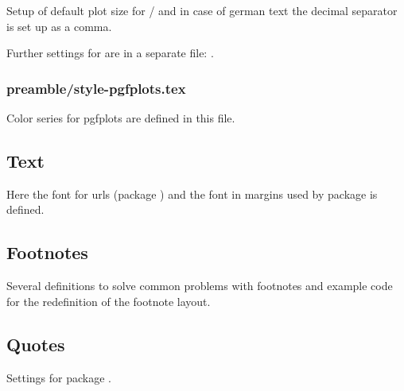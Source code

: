 Setup of default plot size for / and in case of german text the decimal separator is set up as a comma.

Further settings for  are in a separate file: 
.


\subsubsection{preamble/style-pgfplots.tex}

Color series for pgfplots are defined in this file.


\subsection{Text}
\label{sec:style:text}

Here the font for urls (package ) and the font in margins used by package  is defined.


\subsection{Footnotes}
\label{sec:style:footnote}

Several definitions to solve common problems with footnotes and example code for the redefinition of the footnote layout.


\subsection{Quotes}
\label{sec:style:quotes}

Settings for package .

